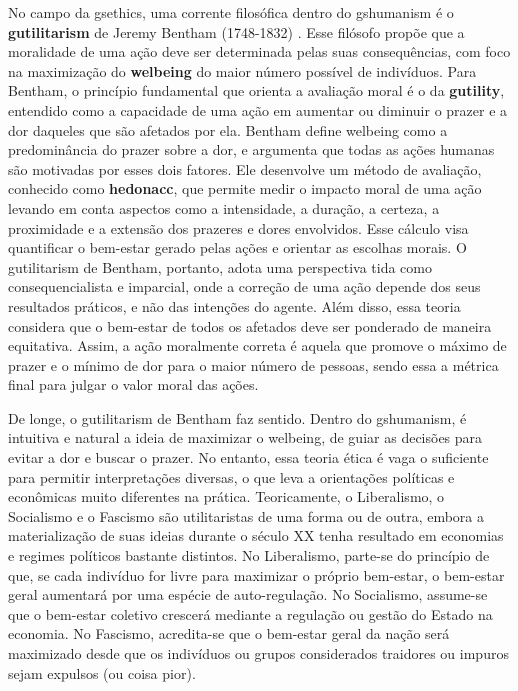 \documentclass[./main.tex]{subfiles}
\begin{document}
\par No campo da \gls{gsethics}, uma corrente filosófica dentro do \gls{gshumanism} é o \textbf{\gls{gutilitarism}} de Jeremy Bentham (1748-1832) \cite{Gordon2002a}. Esse filósofo propõe que a moralidade de uma ação deve ser determinada pelas suas consequências, com foco na maximização do \textbf{\gls{welbeing}} do maior número possível de indivíduos. Para Bentham, o princípio fundamental que orienta a avaliação moral é o da \textbf{\gls{gutility}}, entendido como a capacidade de uma ação em aumentar ou diminuir o prazer e a dor daqueles que são afetados por ela. Bentham define \gls{welbeing} como a predominância do prazer sobre a dor, e argumenta que todas as ações humanas são motivadas por esses dois fatores. Ele desenvolve um método de avaliação, conhecido como \textbf{\gls{hedonacc}}, que permite medir o impacto moral de uma ação levando em conta aspectos como a intensidade, a duração, a certeza, a proximidade e a extensão dos prazeres e dores envolvidos. Esse cálculo visa quantificar o bem-estar gerado pelas ações e orientar as escolhas morais. O \gls{gutilitarism} de Bentham, portanto, adota uma perspectiva tida como consequencialista e imparcial, onde a correção de uma ação depende dos seus resultados práticos, e não das intenções do agente. Além disso, essa \gls{teoria} considera que o bem-estar de todos os afetados deve ser ponderado de maneira equitativa. Assim, a ação moralmente correta é aquela que promove o máximo de prazer e o mínimo de dor para o maior número de pessoas, sendo essa a métrica final para julgar o valor moral das ações. 

\par De longe, o \gls{gutilitarism} de Bentham faz sentido. Dentro do \gls{gshumanism}, é intuitiva e natural a ideia de maximizar o \gls{welbeing}, de guiar as decisões para evitar a dor e buscar o prazer. No entanto, essa \gls{teoria} ética é vaga o suficiente para permitir interpretações diversas, o que leva a orientações políticas e econômicas muito diferentes na prática. Teoricamente, o Liberalismo, o Socialismo e o Fascismo são utilitaristas de uma forma ou de outra, embora a materialização de suas ideias durante o século XX tenha resultado em economias e regimes políticos bastante distintos. No Liberalismo, parte-se do princípio de que, se cada indivíduo for livre para maximizar o próprio bem-estar, o bem-estar geral aumentará por uma espécie de auto-regulação. No Socialismo, assume-se que o bem-estar coletivo crescerá mediante a regulação ou gestão do Estado na economia. No Fascismo, acredita-se que o bem-estar geral da nação será maximizado desde que os indivíduos ou grupos considerados traidores ou impuros sejam expulsos (ou coisa pior). 
\end{document}
